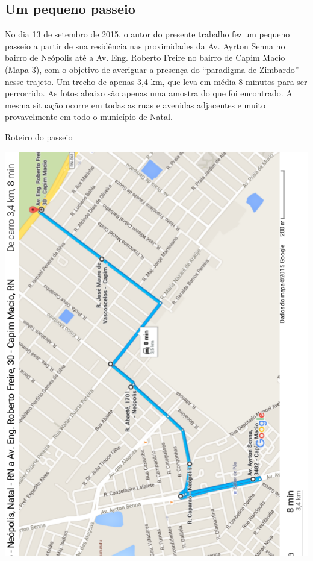 \documentclass[
	12pt,				%
	openright,			%
	twoside,			%
	a4paper,			%
	chapter=TITLE,		%
	section=TITLE,		%
	subsection=TITLE,	%
	subsubsection=TITLE,%
	spanish,            %
	english,			%
	brazil				%
	]{abntex2}
\begin{document}
\begin{anexosenv}
\chapter{Um pequeno passeio}
No dia 13 de setembro de 2015, o autor do presente trabalho fez um pequeno passeio a partir de sua residência nas proximidades da Av. Ayrton Senna no bairro de Neópolis até a Av. Eng. Roberto Freire no bairro de Capim Macio (Mapa 3), com o objetivo de averiguar a presença do “paradigma de Zimbardo” nesse trajeto. Um trecho de apenas 3,4 km, que leva em média 8 minutos para ser percorrido. As fotos abaixo são apenas uma amostra do que foi encontrado. A mesma situação ocorre em todas as ruas e avenidas adjacentes e muito provavelmente em todo o município de Natal.
\newpage
\begin{mapa}[!htpb]
	\caption{\label{Mapa3}Roteiro do passeio}
	\begin{center}
		\includegraphics[scale=1.0]{passeio1.png}
	\end{center}

\end{mapa}
\end{anexosenv}
\end{document}
